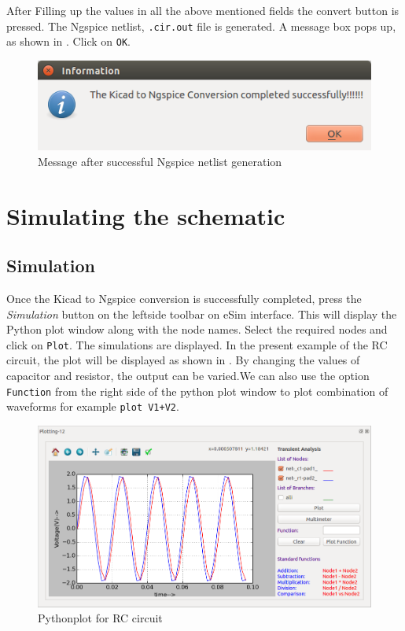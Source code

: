 After Filling up the values in all the above mentioned fields the convert button is pressed. The Ngspice netlist, {\tt .cir.out} file is generated. A message box pops up, as shown in . Click on {\tt OK}.

\begin{figure}
\centering
\includegraphics[width=\lgfig]{manual_images/success.png}
\caption{Message after successful Ngspice netlist generation}
\label{success}
\end{figure}

\section{Simulating the schematic}
\subsection{Simulation}
Once the Kicad to Ngspice conversion is successfully completed, press the \textit{Simulation} button on the leftside toolbar on eSim interface. This will display the Python plot window along with the node names. Select the required nodes and click on {\tt Plot}. The simulations are displayed. In the present example of the RC circuit, the plot will be displayed as shown in .  By changing the values of capacitor and resistor, the output can be varied.We can also use the option {\tt Function} from the right side of the python plot window to plot combination of waveforms for example {\tt plot V1+V2}.

\begin{figure}
\centering
\includegraphics[width=\lgfig]{manual_images/rc-python.png}
\caption{Pythonplot for RC circuit}
\label{rc-python}
\end{figure}

